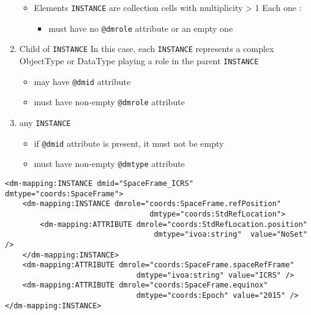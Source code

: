 \begin{enumerate}
\begin{itemize}
     \item Elements \texttt{INSTANCE} are collection cells with multiplicity > 1
          Each one :             
           \begin{itemize}
             \item must have no  \texttt{@dmrole} attribute or an empty one
           \end{itemize}
  \end{itemize}  
    
\item Child of \texttt{INSTANCE}  
     In this case, each \texttt{INSTANCE} represents 
     a complex ObjectType or DataType playing a role in the parent \texttt{INSTANCE}      
     \begin{itemize}
        \item may have  \texttt{@dmid} attribute
        \item must have non-empty  \texttt{@dmrole} attribute
     \end{itemize}
           
\item any \texttt{INSTANCE}      
   \begin{itemize}
        \item if  \texttt{@dmid} attribute is present, it must not be empty
        \item must have non-empty  \texttt{@dmtype} attribute
    \end{itemize}
\end{enumerate}  
    
   
\begin{lstlisting}[frame=single,caption={Example of \texttt{INSTANCE} child of GLOBALS},style=XML,basicstyle=\tiny]
<dm-mapping:INSTANCE dmid="SpaceFrame_ICRS" dmtype="coords:SpaceFrame">
	<dm-mapping:INSTANCE dmrole="coords:SpaceFrame.refPosition"
                                 dmtype="coords:StdRefLocation">
		<dm-mapping:ATTRIBUTE dmrole="coords:StdRefLocation.position" 
		                          dmtype="ivoa:string"  value="NoSet" />
	</dm-mapping:INSTANCE>
	<dm-mapping:ATTRIBUTE dmrole="coords:SpaceFrame.spaceRefFrame" 
	                          dmtype="ivoa:string" value="ICRS" />
	<dm-mapping:ATTRIBUTE dmrole="coords:SpaceFrame.equinox" 
	                          dmtype="coords:Epoch"	value="2015" />
</dm-mapping:INSTANCE>
\end{lstlisting}   
   

